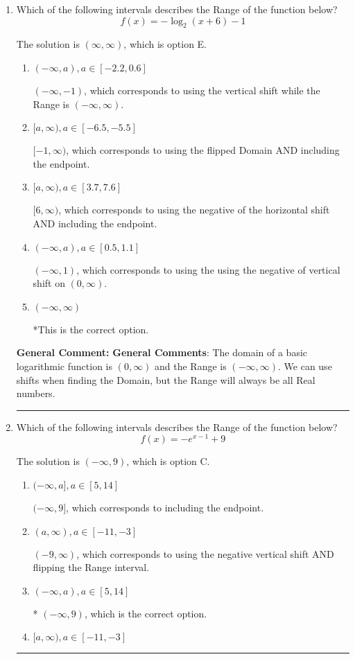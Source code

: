 \documentclass{extbook}[14pt]
\newcommand{\litem}[1]{\item #1

\rule{\textwidth}{0.4pt}}
\begin{document}
\begin{enumerate}\litem{
Which of the following intervals describes the Range of the function below?
\[ f(x) = -\log_2{(x+6)}-1 \]

The solution is \( (\infty, \infty) \), which is option E.\begin{enumerate}[label=\Alph*.]
\item \( (-\infty, a), a \in [-2.2, 0.6] \)

$(-\infty, -1)$, which corresponds to using the vertical shift while the Range is $(-\infty, \infty)$.
\item \( [a, \infty), a \in [-6.5, -5.5] \)

$[-1, \infty)$, which corresponds to using the flipped Domain AND including the endpoint.
\item \( [a, \infty), a \in [3.7, 7.6] \)

$[6, \infty)$, which corresponds to using the negative of the horizontal shift AND including the endpoint.
\item \( (-\infty, a), a \in [0.5, 1.1] \)

$(-\infty, 1)$, which corresponds to using the using the negative of vertical shift on $(0, \infty)$.
\item \( (-\infty, \infty) \)

*This is the correct option.
\end{enumerate}

\textbf{General Comment:} \textbf{General Comments}: The domain of a basic logarithmic function is $(0, \infty)$ and the Range is $(-\infty, \infty)$. We can use shifts when finding the Domain, but the Range will always be all Real numbers.
}
\litem{
Which of the following intervals describes the Range of the function below?
\[ f(x) = -e^{x-1}+9 \]

The solution is \( (-\infty, 9) \), which is option C.\begin{enumerate}[label=\Alph*.]
\item \( (-\infty, a], a \in [5, 14] \)

$(-\infty, 9]$, which corresponds to including the endpoint.
\item \( (a, \infty), a \in [-11, -3] \)

$(-9, \infty)$, which corresponds to using the negative vertical shift AND flipping the Range interval.
\item \( (-\infty, a), a \in [5, 14] \)

* $(-\infty, 9)$, which is the correct option.
\item \( [a, \infty), a \in [-11, -3] \)


\end{enumerate}}
\end{enumerate}
\end{document}
